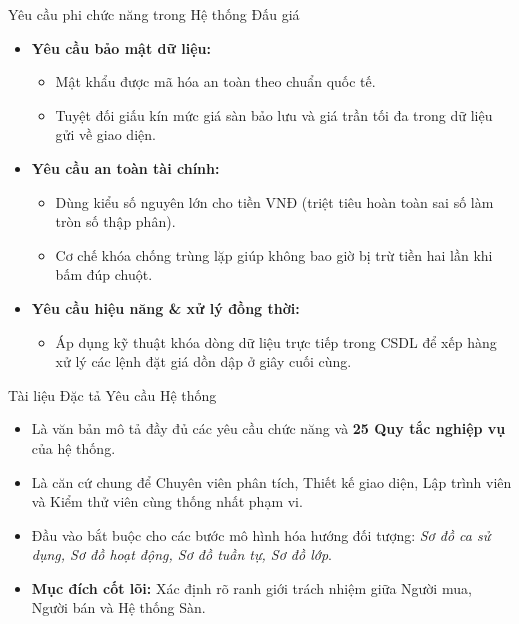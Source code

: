\documentclass[aspectratio=169, 10pt]{beamer}
\begin{document}
\begin{frame}{Yêu cầu phi chức năng trong Hệ thống Đấu giá}
    \begin{itemize}
        \item \textbf{Yêu cầu bảo mật dữ liệu:}
        \begin{itemize}
            \item Mật khẩu được mã hóa an toàn theo chuẩn quốc tế.
            \item Tuyệt đối giấu kín mức giá sàn bảo lưu và giá trần tối đa trong dữ liệu gửi về giao diện.
        \end{itemize}
        \item \textbf{Yêu cầu an toàn tài chính:}
        \begin{itemize}
            \item Dùng kiểu số nguyên lớn cho tiền VNĐ (triệt tiêu hoàn toàn sai số làm tròn số thập phân).
            \item Cơ chế khóa chống trùng lặp giúp không bao giờ bị trừ tiền hai lần khi bấm đúp chuột.
        \end{itemize}
        \item \textbf{Yêu cầu hiệu năng \& xử lý đồng thời:}
        \begin{itemize}
            \item Áp dụng kỹ thuật khóa dòng dữ liệu trực tiếp trong CSDL để xếp hàng xử lý các lệnh đặt giá dồn dập ở giây cuối cùng.
        \end{itemize}
    \end{itemize}
\end{frame}

\begin{frame}{Tài liệu Đặc tả Yêu cầu Hệ thống}
    \begin{itemize}
        \item Là văn bản mô tả đầy đủ các yêu cầu chức năng và \textbf{25 Quy tắc nghiệp vụ} của hệ thống.
        \item Là căn cứ chung để Chuyên viên phân tích, Thiết kế giao diện, Lập trình viên và Kiểm thử viên cùng thống nhất phạm vi.
        \item Đầu vào bắt buộc cho các bước mô hình hóa hướng đối tượng: \textit{Sơ đồ ca sử dụng, Sơ đồ hoạt động, Sơ đồ tuần tự, Sơ đồ lớp}.
        \item \textbf{Mục đích cốt lõi:} Xác định rõ ranh giới trách nhiệm giữa Người mua, Người bán và Hệ thống Sàn.
    \end{itemize}
\end{frame}
\end{document}
